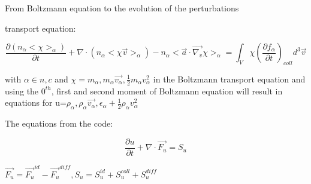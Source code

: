 \documentclass{beamer}
\begin{document}
\begin{frame}{From Boltzmann equation to the evolution of the perturbations}

transport equation:

\begin{equation}
\frac{\partial (n_{\alpha} <\chi>_{\alpha})}{\partial t} + \nabla \cdot (n_{\alpha} <\chi \vec{v}>_{\alpha} ) - n_{\alpha}<\vec{a} \cdot \vec{\nabla_v} \chi>_{\alpha} = \int_V{\chi (\frac{\partial f_{\alpha}}{\partial t})_{coll} d^3\vec{v} }
\end{equation}

with $\alpha \in n,c$ and  $\chi=m_{\alpha}, m_{\alpha} \vec{v_\alpha}, \frac{1}{2} m_\alpha v_\alpha^2 $ in the Boltzmann transport equation
and using the $0^{th}$, first and second moment of Boltzmann equation
will result in  equations for u=$\rho_\alpha,\rho_\alpha \vec{v_\alpha},\epsilon_\alpha + \frac{1}{2}\rho_\alpha v_\alpha^2 $ 


The equations from the code: 

\begin{equation}
\frac{\partial u}{\partial t} + \nabla \cdot \vec{F_u} = S_u
\end{equation}

$\vec{F_u} = \vec{F_u}^{id} - \vec{F_u}^{diff}, S_u = S_u^{id} + S_u^{coll} + S_u^{diff}$


\end{frame}
\end{document}
